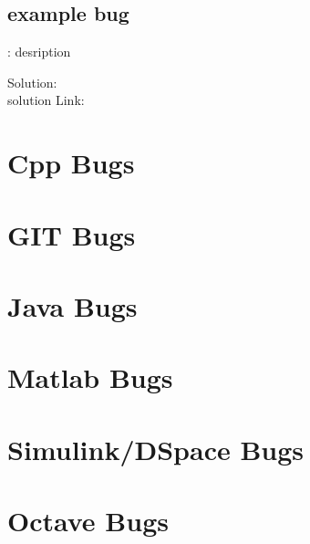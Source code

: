 


\subsection{ example bug }
\begin{bug}{}{}
	\caption{: desription}
  Solution:\\
  solution
  Link: \href{}{}\\
\end{bug}

\newpage{}
\section{Cpp Bugs} \label{sec:cpp_bugs}


\newpage{}
\section{GIT Bugs} \label{sec:git_bugs}


\newpage{}
\section{Java Bugs} \label{sec:java_bugs}


\newpage{}
\section{Matlab Bugs} \label{sec:matlab_bugs}


\newpage{}
\section{Simulink/DSpace Bugs} \label{sec:simulink_dspace_bugs}


\newpage{}
\section{Octave Bugs} \label{sec:octave_bugs}


